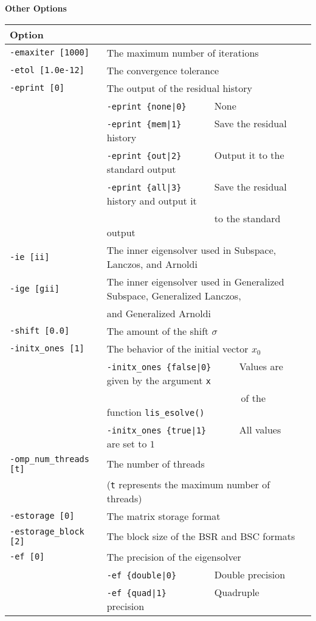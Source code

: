 \documentclass[a4paper]{article}
\begin{document}
\begin{minipage}[t]{\textwidth}
\begin{center}
{\bf Other Options}\\
\begin{tabular}{l|ll}\hline\hline
Option &                          \\ \hline
\verb=-emaxiter [1000]= & The maximum number of iterations         \\ 
\verb=-etol [1.0e-12]=  & The convergence tolerance          \\
\verb=-eprint [0]=      & The output of the residual history                \\
                       & \verb=-eprint {none|0}     =  None \\
                       & \verb=-eprint {mem|1}      =  Save the residual history\\
                       & \verb=-eprint {out|2}      =  Output it to the standard output\\
                       & \verb=-eprint {all|3}      =  Save the residual history and output it \\
                       & \verb=                     =  to the standard output\\
\verb=-ie [ii]= & The inner eigensolver used in Subspace, Lanczos, and Arnoldi\\
\verb=-ige [gii]= & The inner eigensolver used in Generalized Subspace, Generalized Lanczos, \\
                       & and Generalized Arnoldi\\
\verb=-shift [0.0]= & The amount of the shift $\sigma$ \\
\verb=-initx_ones [1]= & The behavior of the initial vector $x_{0}$  \\
                       & \verb=-initx_ones {false|0}     =  Values are given by the argument \verb=x= \\
                       & \verb=                           =  of the function \verb=lis_esolve()= \\
                       & \verb=-initx_ones {true|1}      =  All values are set to $1$ \\
\verb=-omp_num_threads [t]= & The number of threads        \\ 
                            & (\verb=t= represents the maximum number of
 threads) \\
\verb=-estorage [0]=   & The matrix storage format \\
\verb=-estorage_block [2]=& The block size of the BSR and BSC formats\\ 
\verb=-ef [0]=         & The precision of the eigensolver\\
                       & \verb=-ef {double|0}       =  Double precision \\ 
                       & \verb=-ef {quad|1}         =  Quadruple precision \\
\hline         
\end{tabular}
\end{center}
\end{minipage}
\end{document}
